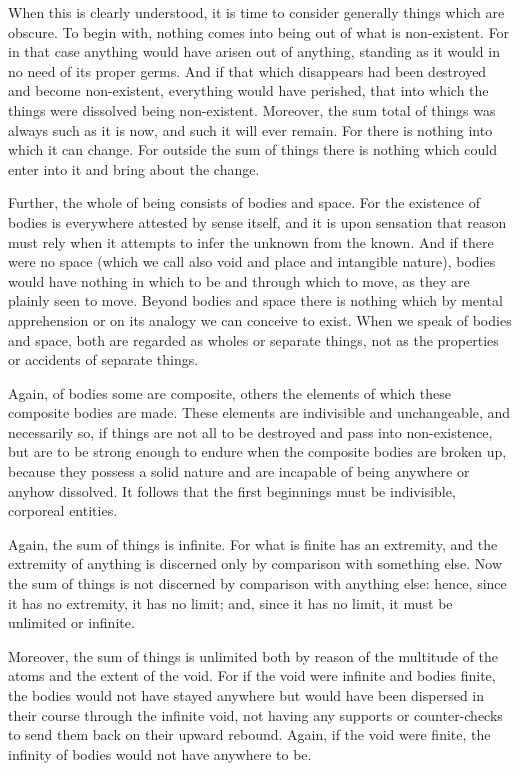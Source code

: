 \documentclass{stex}
\begin{document}
When this is clearly understood, it is time to consider generally things which are obscure.
To begin with, nothing comes into being out of what is non-existent.
For in that case anything would have arisen out of anything, standing as it would in no need of its proper germs.
And if that which disappears had been destroyed and become non-existent, everything would have perished, that into which the things were dissolved being non-existent.
Moreover, the sum total of things was always such as it is now, and such it will ever remain.
For there is nothing into which it can change.
For outside the sum of things there is nothing which could enter into it and bring about the change.

Further, the whole of being consists of bodies and space.
For the existence of bodies is everywhere attested by sense itself, and it is upon sensation that reason must rely when it attempts to infer the unknown from the known.
And if there were no space (which we call also void and place and intangible nature), bodies would have nothing in which to be and through which to move, as they are plainly seen to move.
Beyond bodies and space there is nothing which by mental apprehension or on its analogy we can conceive to exist.
When we speak of bodies and space, both are regarded as wholes or separate things, not as the properties or accidents of separate things.

Again, of bodies some are composite, others the elements of which these composite bodies are made.
These elements are indivisible and unchangeable, and necessarily so, if things are not all to be destroyed and pass into non-existence, but are to be strong enough to endure when the composite bodies are broken up, because they possess a solid nature and are incapable of being anywhere or anyhow dissolved.
It follows that the first beginnings must be indivisible, corporeal entities.

Again, the sum of things is infinite.
For what is finite has an extremity, and the extremity of anything is discerned only by comparison with something else.
Now the sum of things is not discerned by comparison with anything else: hence, since it has no extremity, it has no limit; and, since it has no limit, it must be unlimited or infinite.

Moreover, the sum of things is unlimited both by reason of the multitude of the atoms and the extent of the void.
For if the void were infinite and bodies finite, the bodies would not have stayed anywhere but would have been dispersed in their course through the infinite void, not having any supports or counter-checks to send them back on their upward rebound.
Again, if the void were finite, the infinity of bodies would not have anywhere to be.
\end{document}
